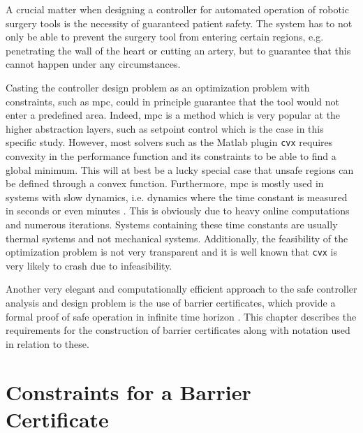 A crucial matter when designing a controller for automated operation of robotic surgery tools is the necessity of guaranteed patient safety. The system has to not only be able to prevent the surgery tool from entering certain regions, e.g. penetrating the wall of the heart or cutting an artery, but to guarantee that this cannot happen under any circumstances.


Casting the controller design problem as an optimization problem with constraints, such as \gls{mpc}, could in principle guarantee that the tool would not enter a predefined area. Indeed, \gls{mpc} is a method which is very popular at the higher abstraction layers, such as setpoint control \citep{bib:mpc_simon} which is the case in this specific study. However, most solvers such as the Matlab plugin \texttt{cvx} requires convexity in the performance function and its constraints to be able to find a global minimum. This will at best be a lucky special case that unsafe regions can be defined through a convex function.  
Furthermore, \gls{mpc} is mostly used in systems with slow dynamics, i.e. dynamics where the time constant is measured in seconds or even minutes \citep{bib:mpc_slow}. This is obviously due to heavy online computations and numerous iterations. Systems containing these time constants are usually thermal systems and not mechanical systems. Additionally, the feasibility of the optimization problem is not very transparent and it is well known that \texttt{cvx} is very likely to crash due to infeasibility.

Another very elegant and computationally efficient approach to the safe controller analysis and design problem is the use of barrier certificates, which provide a formal proof of safe operation in infinite time horizon \citep{bib:barrier_prajna,bib:safety}. This chapter describes the requirements for the construction of barrier certificates along with notation used in relation to these.
%





\section{Constraints for a Barrier Certificate}\label{sec:safety-def}

